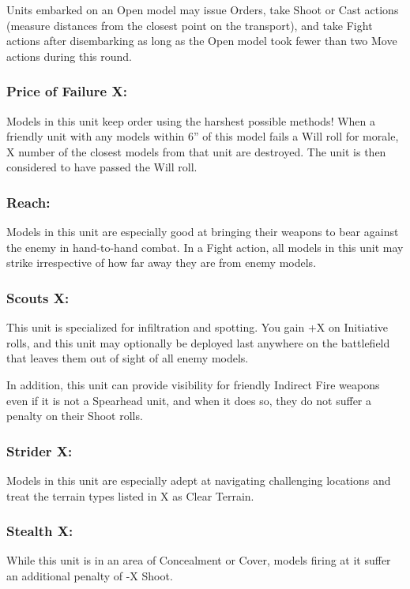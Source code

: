 \begin{multicols}{2}
Units embarked on an Open model may issue Orders, take Shoot or Cast actions (measure distances from the closest point on the transport), and take Fight actions after disembarking as long as the Open model took fewer than two Move actions during this round.

\subsubsection*{Price of Failure X:} Models in this unit keep order using the harshest possible methods! When a friendly unit with any models within 6'' of this model fails a Will roll for morale, X number of the closest models from that unit are destroyed. The unit is then considered to have passed the Will roll.

\subsubsection*{Reach:} Models in this unit are especially good at bringing their weapons to bear against the enemy in hand-to-hand combat. In a Fight action, all models in this unit may strike irrespective of how far away they are from enemy models.

\subsubsection*{Scouts X:} This unit is specialized for infiltration and spotting. You gain +X on Initiative rolls, and this unit may optionally be deployed last anywhere on the battlefield that leaves them out of sight of all enemy models.

In addition, this unit can provide visibility for friendly Indirect Fire weapons even if it is not a Spearhead unit, and when it does so, they do not suffer a penalty on their Shoot rolls.

\subsubsection*{Strider X:} Models in this unit are especially adept at navigating challenging locations and treat the terrain types listed in X as Clear Terrain.

\subsubsection*{Stealth X:} While this unit is in an area of Concealment or Cover, models firing at it suffer an additional penalty of -X Shoot.


\end{multicols}
